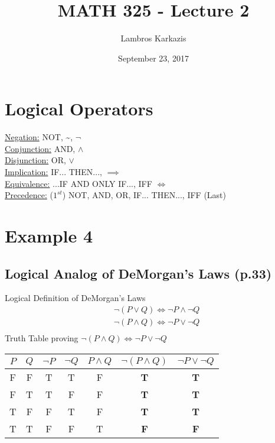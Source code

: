 \documentclass{article}
\title{MATH 325 - Lecture 2}
\author{Lambros Karkazis}
\date{September 23, 2017}
\begin{document}
\maketitle
\section{Logical Operators}
\underline{Negation:} NOT, \textasciitilde, $\neg$\\
\underline{Conjunction:} AND, $\wedge$\\
\underline{Disjunction:} OR, $\vee$\\
\underline{Implication:} IF... THEN..., $\implies$\\
\underline{Equivalence:} ...IF AND ONLY IF..., IFF $\iff$\\
\underline{Precedence:} ($1^{st}$) NOT, AND, OR, IF... THEN..., IFF (Last)\\

\section{Example 4}
\subsection{Logical Analog of DeMorgan's Laws (p.33)}
Logical Definition of DeMorgan's Laws
\begin{align*}
	&\neg(P \vee Q) \iff \neg P \wedge \neg Q\\
	&\neg(P \wedge Q) \iff \neg P \vee \neg Q\\
\end{align*}
Truth Table proving $\neg(P \wedge Q) \iff \neg P \vee \neg Q$
\begin{center}
        \begin{tabular}{||c | c | c | c | c | c | c ||} 
        \hline\hline
        $P$ & $Q$ & $\neg P$ & $\neg Q$ & $P \wedge Q$ &$ \neg(P \wedge Q)$ & $\neg P \vee \neg Q$ \\ [0.5ex] 
        \hline\hline
        F & F & T & T & F & \textbf{T} & \textbf{T}\\ 
        \hline
        F & T & T & F & F & \textbf{T} & \textbf{T}\\
        \hline
        T & F & F & T & F &\textbf{T} & \textbf{T}\\
        \hline
        T & T & F & F & T & \textbf{F} & \textbf{F}\\
        \hline\hline
        \end{tabular}
\end{center}
\end{document}
